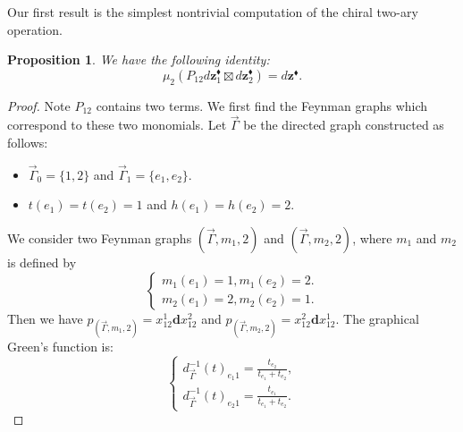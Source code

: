 \documentclass[11pt]{amsart}
\newtheorem{prop}[thm]{Proposition}
\theoremstyle{definition}
\theoremstyle{remark}
\numberwithin{equation}{section}
\begin{document}
Our first result is the simplest nontrivial computation of the chiral two-ary operation.
    \begin{prop}
        We have the following identity:
        $$
        \mu_{2}(P_{12}
        d \mathbf{z}_{1}^{\blacklozenge} \boxtimes d \mathbf{z}^{\blacklozenge}_{2})
        = d \mathbf{z}
        ^{\blacklozenge} .
        $$
    \end{prop}
    \begin{proof}
    Note $P_{12}$ contains two terms. We first find the Feynman graphs which correspond to these two monomials. Let
    $\vec{\Gamma}$ be the directed graph constructed as follows:
        \begin{itemize}
            \item $\vec{\Gamma}_{0}=\{1,2\}$ and $\vec{\Gamma}_{1}=\{e_{1},e_{2}\}$.
            \item $t(e_{1})=t(e_{2})=1$ and $h(e_{1})=h(e_{2})=2$.
        \end{itemize}
        We consider two Feynman graphs $(\vec{\Gamma},m_{1},2)$ and $(\vec{\Gamma},m_{2},2)$, where $m_{1}$ and $m_{2}$ is defined by
        $$
        \begin{cases}
            m_{1}(e_{1})=1, m_{1}(e_{2})=2.\\
            m_{2}(e_{1})=2, m_{2}(e_{2})=1.
        \end{cases}
        $$
        Then we have $p_{(\vec{\Gamma},m_{1},2)}=x_{12}^1\mathbf{d}x_{12}^{2}$ and $p_{(\vec{\Gamma},m_{2},2)}=x_{12}^{2}
        \mathbf{d}x_{12}^{1}$. The graphical Green's function is:
        $$
        \begin{cases}
            d^{-1}_{\vec{\Gamma}}(t)_{e_{1}1}=\frac{t_{e_{2}}}{t_{e_{1}}+t_{e_{2}}},\\
            d^{-1}_{\vec{\Gamma}}(t)_{e_{2}1}=\frac{t_{e_{1}}}{t_{e_{1}}+t_{e_{2}}}.
        \end{cases}
        $$


\end{proof}
\end{document}

